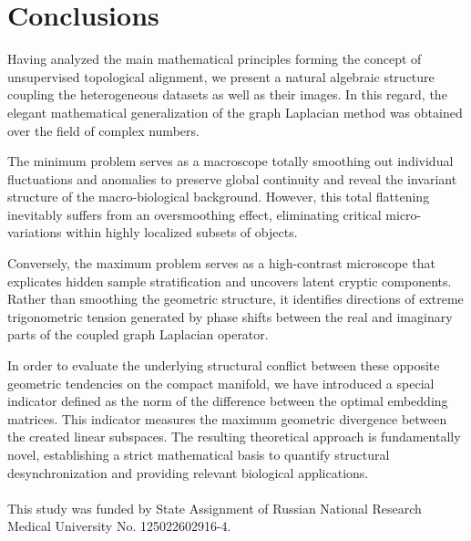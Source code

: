 \documentclass[a4paper,twoside,12pt]{article}
\begin{document}
\section{Conclusions}


Having  analyzed  the main mathematical principles forming  the concept of  unsupervised topological alignment, we present a natural algebraic structure coupling the heterogeneous  datasets as well as their images. In this regard, the elegant mathematical   generalization of the graph Laplacian  method was obtained over the field of   complex numbers.


The minimum problem serves  as a  macroscope totally smoothing out individual  fluctuations and anomalies to preserve global continuity and reveal the invariant structure of the macro-biological background. However, this total flattening inevitably suffers from an oversmoothing effect,
eliminating critical micro-variations within highly localized subsets of objects.

Conversely,  the maximum problem  serves as a high-contrast  microscope  that explicates hidden sample stratification and uncovers latent cryptic components. Rather than smoothing the geometric structure, it  identifies directions of extreme trigonometric tension   generated by phase shifts between the real and imaginary parts of the coupled graph Laplacian operator.



In order to  evaluate the underlying structural conflict between these opposite geometric tendencies on the compact manifold, we have introduced a special indicator defined as the norm of the difference between the optimal embedding matrices. This indicator measures the maximum geometric divergence between the created  linear subspaces. The resulting theoretical approach is  fundamentally novel, establishing a strict mathematical basis to quantify structural desynchronization and providing relevant biological applications.\\





\\ This study was funded by State Assignment of Russian National Research Medical University No. 125022602916-4.
\end{document}
